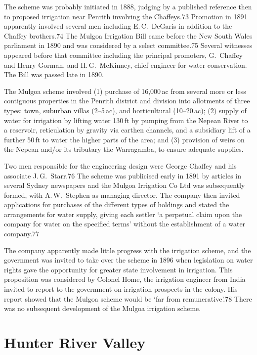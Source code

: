 The scheme was probably initiated in 1888, judging by a published
reference then to proposed irrigation near Penrith involving the
Chaffeys.73 Promotion in 1891 apparently involved several men
including E.\,C.~DeGaris in addition to the Chaffey brothers.74 The
Mulgoa Irrigation Bill came before the New South Wales parliament in
1890 and was considered by a select committee.75 Several witnesses
appeared before that committee including the principal promoters,
G.~Chaffey and Henry Gorman, and H.\,G.~McKinney, chief engineer for
water conservation. The Bill was passed late in 1890.

The Mulgoa scheme involved (1) purchase of 16,000\,ac from several
more or less contiguous properties in the Penrith district and
division into allotments of three types: town, suburban villas
(2--5\,ac), and horticultural (10--20\,ac); (2) supply of water for
irrigation by lifting water 130\,ft by pumping from the Nepean River
to a reservoir, reticulation by gravity via earthen channels, and a
subsidiary lift of a further 50\,ft to water the higher parts of the
area; and (3) provision of weirs on the Nepean and/or its tributary
the Warragamba, to ensure adequate supplies.

Two men responsible for the engineering design were George Chaffey and
his associate J.\,G.~Starr.76 The scheme was publicised early in 1891
by articles in several Sydney newspapers and the Mulgoa Irrigation Co
Ltd was subsequently formed, with A.\,W.~Stephen as managing director.
The company then invited applications for purchases of the different
types of holdings and stated the arrangements for water supply, giving
each settler `a perpetual claim upon the company for water on the
specified terms' without the establishment of a water company.77

The company apparently made little progress with the irrigation
scheme, and the government was invited to take over the scheme in 1896
when legislation on water rights gave the opportunity for greater
state involvement in irrigation.  This proposition was considered by
Colonel Home, the irrigation engineer from India invited to report to
the government on irrigation prospects in the colony.  His report
showed that the Mulgoa scheme would be `far from remunerative'.78
There was no subsequent development of the Mulgoa irrigation scheme.

\section{Hunter River Valley}

